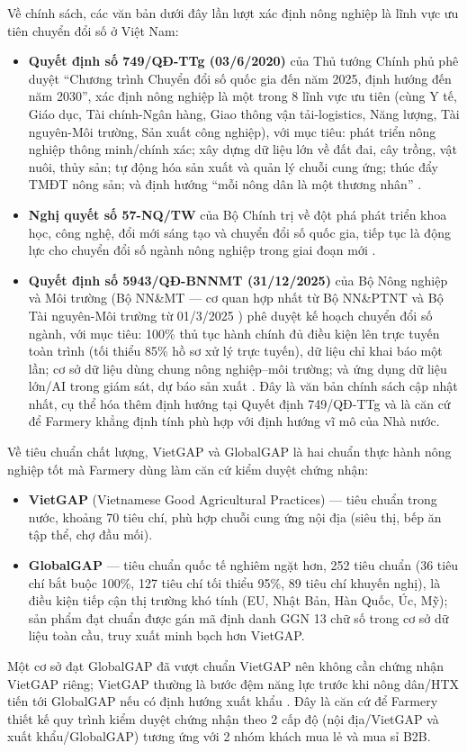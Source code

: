 Về chính sách, các văn bản dưới đây lần lượt xác định nông nghiệp là lĩnh vực ưu tiên chuyển đổi số ở Việt Nam:
\begin{itemize}
    \item \textbf{Quyết định số 749/QĐ-TTg (03/6/2020)} của Thủ tướng Chính phủ phê duyệt ``Chương trình Chuyển đổi số quốc gia đến năm 2025, định hướng đến năm 2030'', xác định nông nghiệp là một trong 8 lĩnh vực ưu tiên (cùng Y tế, Giáo dục, Tài chính-Ngân hàng, Giao thông vận tải-logistics, Năng lượng, Tài nguyên-Môi trường, Sản xuất công nghiệp), với mục tiêu: phát triển nông nghiệp thông minh/chính xác; xây dựng dữ liệu lớn về đất đai, cây trồng, vật nuôi, thủy sản; tự động hóa sản xuất và quản lý chuỗi cung ứng; thúc đẩy TMĐT nông sản; và định hướng ``mỗi nông dân là một thương nhân'' \cite{qd749_2020}.
    \item \textbf{Nghị quyết số 57-NQ/TW} của Bộ Chính trị về đột phá phát triển khoa học, công nghệ, đổi mới sáng tạo và chuyển đổi số quốc gia, tiếp tục là động lực cho chuyển đổi số ngành nông nghiệp trong giai đoạn mới \cite{nq57_tw}.
    \item \textbf{Quyết định số 5943/QĐ-BNNMT (31/12/2025)} của Bộ Nông nghiệp và Môi trường (Bộ NN\&MT --- cơ quan hợp nhất từ Bộ NN\&PTNT và Bộ Tài nguyên-Môi trường từ 01/3/2025 \cite{botnmt_2025}) phê duyệt kế hoạch chuyển đổi số ngành, với mục tiêu: 100\% thủ tục hành chính đủ điều kiện lên trực tuyến toàn trình (tối thiểu 85\% hồ sơ xử lý trực tuyến), dữ liệu chỉ khai báo một lần; cơ sở dữ liệu dùng chung nông nghiệp--môi trường; và ứng dụng dữ liệu lớn/AI trong giám sát, dự báo sản xuất \cite{qd5943_2025}. Đây là văn bản chính sách cập nhật nhất, cụ thể hóa thêm định hướng tại Quyết định 749/QĐ-TTg và là căn cứ để Farmery khẳng định tính phù hợp với định hướng vĩ mô của Nhà nước.
\end{itemize}

Về tiêu chuẩn chất lượng, VietGAP và GlobalGAP là hai chuẩn thực hành nông nghiệp tốt mà Farmery dùng làm căn cứ kiểm duyệt chứng nhận:
\begin{itemize}
    \item \textbf{VietGAP} (Vietnamese Good Agricultural Practices) --- tiêu chuẩn trong nước, khoảng 70 tiêu chí, phù hợp chuỗi cung ứng nội địa (siêu thị, bếp ăn tập thể, chợ đầu mối).
    \item \textbf{GlobalGAP} --- tiêu chuẩn quốc tế nghiêm ngặt hơn, 252 tiêu chuẩn (36 tiêu chí bắt buộc 100\%, 127 tiêu chí tối thiểu 95\%, 89 tiêu chí khuyến nghị), là điều kiện tiếp cận thị trường khó tính (EU, Nhật Bản, Hàn Quốc, Úc, Mỹ); sản phẩm đạt chuẩn được gán mã định danh GGN 13 chữ số trong cơ sở dữ liệu toàn cầu, truy xuất minh bạch hơn VietGAP.
\end{itemize}
Một cơ sở đạt GlobalGAP đã vượt chuẩn VietGAP nên không cần chứng nhận VietGAP riêng; VietGAP thường là bước đệm năng lực trước khi nông dân/HTX tiến tới GlobalGAP nếu có định hướng xuất khẩu \cite{vietgap_globalgap}. Đây là căn cứ để Farmery thiết kế quy trình kiểm duyệt chứng nhận theo 2 cấp độ (nội địa/VietGAP và xuất khẩu/GlobalGAP) tương ứng với 2 nhóm khách mua lẻ và mua sỉ B2B.

